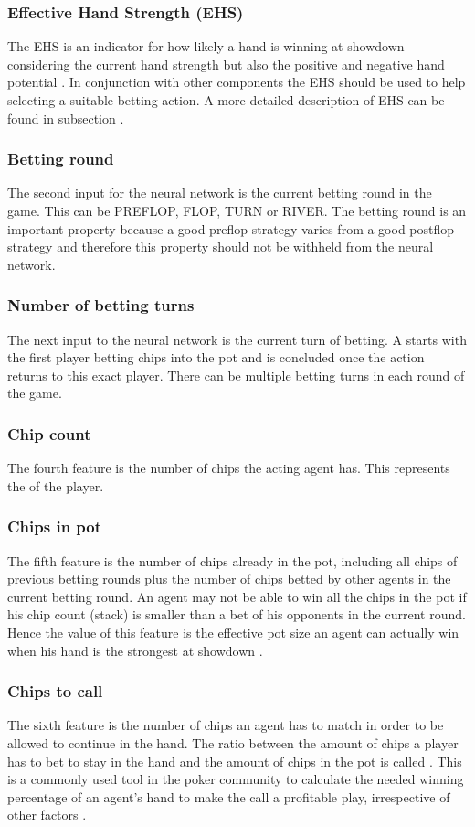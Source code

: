 \subsubsection{Effective Hand Strength (EHS)}
The EHS is an indicator for how likely a hand is winning at showdown considering the current hand strength but also the positive and negative hand potential \cite{evolutionary_methods}. In conjunction with other components the EHS should be used to help selecting a suitable betting action. A more detailed description of EHS can be found in subsection .
\subsubsection{Betting round}
The second input for the neural network is the current betting round in the game. This can be PREFLOP, FLOP, TURN or RIVER. The betting round is an important property because a good preflop strategy varies from a good postflop strategy and therefore this property should not be withheld from the neural network.
\subsubsection{Number of betting turns}
The next input to the neural network is the current turn of betting. A  starts with the first player betting chips into the pot and is concluded once the action returns to this exact player. There can be multiple betting turns in each round of the game. 
\subsubsection{Chip count}
The fourth feature is the number of chips the acting agent has. This represents the  of the player. 
\subsubsection{Chips in pot}
The fifth feature is the number of chips already in the pot, including all chips of previous betting rounds plus the number of chips betted by other agents in the current betting round. An agent may not be able to win all the chips in the pot if his chip count (stack) is smaller than a bet of his opponents in the current round. Hence the value of this feature is the effective pot size an agent can actually win when his hand is the strongest at showdown \cite{evolutionary_methods}.
\subsubsection{Chips to call}
The sixth feature is the number of chips an agent has to match in order to be allowed to continue in the hand. 
The ratio between the amount of chips a player has to bet to stay in the hand and the amount of chips in the pot is called . This is a commonly used tool in the poker community to calculate the needed winning percentage of an agent's hand to make the call a profitable play, irrespective of other factors \cite{evolutionary_methods}.

